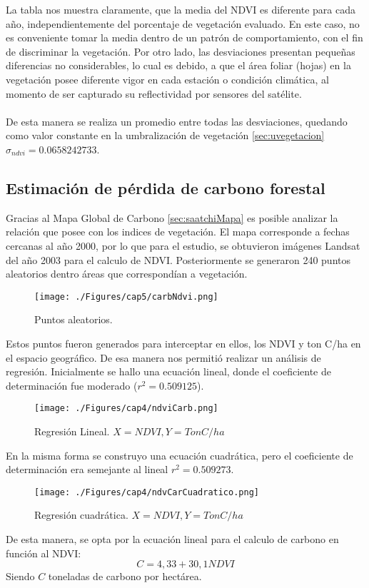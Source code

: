 La tabla nos muestra claramente, que la media del NDVI es diferente para cada a\~{n}o, independientemente del porcentaje de vegetaci\'on evaluado. En este caso, no es conveniente tomar la media dentro de un patrón de comportamiento, con el fin de discriminar la vegetaci\'on. Por otro lado, las desviaciones presentan peque\~{n}as diferencias no considerables, lo cual es debido, a que el \'area foliar (hojas) en la vegetaci\'on posee diferente vigor en cada estaci\'on o condici\'on clim\'atica, al momento de ser capturado su reflectividad por sensores del sat\'elite.\\~\\
De esta manera se realiza un promedio entre todas las desviaciones, quedando como valor constante en la umbralizaci\'on de vegetaci\'on \ref{sec:uvegetacion}$ \sigma_{ndvi} = 0.0658242733 $.
\subsection{Estimaci\'on de p\'erdida de carbono forestal}
Gracias al Mapa Global de Carbono \ref{sec:saatchiMapa} es posible analizar la relaci\'on que posee con los indices de vegetaci\'on. El mapa corresponde a fechas cercanas al a\~{n}o 2000, por lo que para el estudio, se obtuvieron im\'agenes Landsat del a\~{n}o 2003 para el calculo de NDVI. Posteriormente se generaron 240 puntos aleatorios dentro \'areas que correspond\'ian a vegetaci\'on.
\begin{figure}[H]
	\centering
	\texttt{[image: ./Figures/cap5/carbNdvi.png]}
	\caption{Puntos aleatorios.}
	\label{fig:aleatorioCrb}
\end{figure}
Estos puntos fueron generados para interceptar en ellos, los NDVI y ton C/ha en el espacio geográfico. De esa manera nos permiti\'o realizar un an\'alisis de regresi\'on. Inicialmente se hallo una ecuaci\'on lineal, donde el coeficiente de determinaci\'on fue moderado ($ r^{2}=0.509125 $).
\begin{figure}[H]
	\centering
	\texttt{[image: ./Figures/cap4/ndviCarb.png]}
	\caption{Regresi\'on Lineal. $ X=NDVI, Y=TonC/ha $}
	\label{fig:linealCar}
\end{figure}
En la misma forma se construyo una ecuaci\'on cuadr\'atica, pero el coeficiente de determinaci\'on era semejante al lineal $ r^{2}=0.509273 $.
\begin{figure}[H]
	\centering
	\texttt{[image: ./Figures/cap4/ndvCarCuadratico.png]}
	\caption{Regresi\'on cuadr\'atica. $ X=NDVI, Y=TonC/ha $}
	\label{fig:cuaCar}
\end{figure}
De esta manera, se opta por la ecuaci\'on lineal para el calculo de carbono en funci\'on al NDVI:
		\begin{equation}
		C=4,33+30,1 NDVI
		\end{equation} 
Siendo $ C $ toneladas de carbono por hect\'area.

